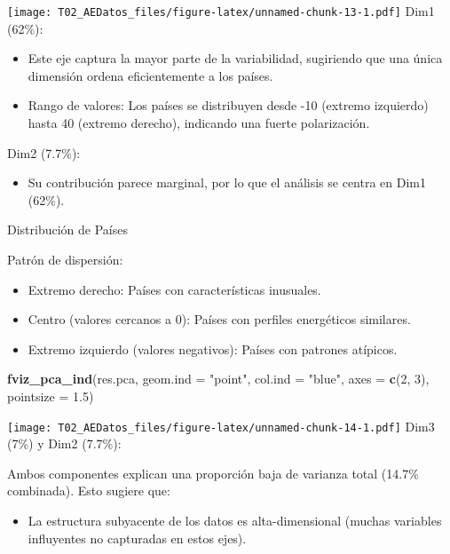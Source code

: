 \documentclass[
]{article}
\newenvironment{Shaded}{\begin{snugshade}}{\end{snugshade}}
\newcommand{\AttributeTok}[1]{\textcolor[rgb]{0.13,0.29,0.53}{#1}}
\newcommand{\DecValTok}[1]{\textcolor[rgb]{0.00,0.00,0.81}{#1}}
\newcommand{\FloatTok}[1]{\textcolor[rgb]{0.00,0.00,0.81}{#1}}
\newcommand{\FunctionTok}[1]{\textcolor[rgb]{0.13,0.29,0.53}{\textbf{#1}}}
\newcommand{\NormalTok}[1]{#1}
\newcommand{\StringTok}[1]{\textcolor[rgb]{0.31,0.60,0.02}{#1}}
\providecommand{\tightlist}{%
  \setlength{\itemsep}{0pt}\setlength{\parskip}{0pt}}
\begin{document}
\texttt{[image: T02\_AEDatos\_files/figure-latex/unnamed-chunk-13-1.pdf]}
Dim1 (62\%):

\begin{itemize}
\item
  Este eje captura la mayor parte de la variabilidad, sugiriendo que una
  única dimensión ordena eficientemente a los países.
\item
  Rango de valores: Los países se distribuyen desde -10 (extremo
  izquierdo) hasta 40 (extremo derecho), indicando una fuerte
  polarización.
\end{itemize}

Dim2 (7.7\%):

\begin{itemize}
\tightlist
\item
  Su contribución parece marginal, por lo que el análisis se centra en
  Dim1 (62\%).
\end{itemize}

Distribución de Países

Patrón de dispersión:

\begin{itemize}
\item
  Extremo derecho: Países con características inusuales.
\item
  Centro (valores cercanos a 0): Países con perfiles energéticos
  similares.
\item
  Extremo izquierdo (valores negativos): Países con patrones atípicos.
\end{itemize}

\begin{Shaded}
\begin{Highlighting}[]
\FunctionTok{fviz\_pca\_ind}\NormalTok{(res.pca, }\AttributeTok{geom.ind =} \StringTok{"point"}\NormalTok{, }
             \AttributeTok{col.ind =} \StringTok{"blue"}\NormalTok{, }
             \AttributeTok{axes =} \FunctionTok{c}\NormalTok{(}\DecValTok{2}\NormalTok{, }\DecValTok{3}\NormalTok{), }
             \AttributeTok{pointsize =} \FloatTok{1.5}\NormalTok{) }
\end{Highlighting}
\end{Shaded}

\texttt{[image: T02\_AEDatos\_files/figure-latex/unnamed-chunk-14-1.pdf]}
Dim3 (7\%) y Dim2 (7.7\%):

Ambos componentes explican una proporción baja de varianza total (14.7\%
combinada). Esto sugiere que:

\begin{itemize}
\tightlist
\item
  La estructura subyacente de los datos es alta-dimensional (muchas
  variables influyentes no capturadas en estos ejes).
\end{itemize}
\end{document}

